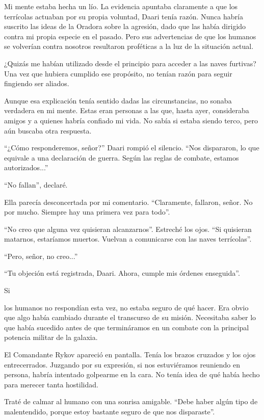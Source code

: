 Mi mente estaba hecha un lío. La evidencia apuntaba claramente a que los terrícolas actuaban por su propia voluntad, Daari tenía razón. Nunca habría suscrito las ideas de la Oradora sobre la agresión, dado que las había dirigido contra mi propia especie en el pasado. Pero sus advertencias de que los humanos se volverían contra nosotros resultaron proféticas a la luz de la situación actual.

¿Quizás me habían utilizado desde el principio para acceder a las naves furtivas? Una vez que hubiera cumplido ese propósito, no tenían razón para seguir fingiendo ser aliados.

Aunque esa explicación tenía sentido dadas las circunstancias, no sonaba verdadera en mi mente. Estas eran personas a las que, hasta ayer, consideraba amigos y a quienes habría confiado mi vida. No sabía si estaba siendo terco, pero aún buscaba otra respuesta.

``¿Cómo responderemos, señor?'' Daari rompió el silencio. ``Nos dispararon, lo que equivale a una declaración de guerra. Según las reglas de combate, estamos autorizados...''

``No fallan'', declaré.

Ella parecía desconcertada por mi comentario. ``Claramente, fallaron, señor. No por mucho. Siempre hay una primera vez para todo''.

``No creo que alguna vez quisieran alcanzarnos''. Estreché los ojos. ``Si quisieran matarnos, estaríamos muertos. Vuelvan a comunicarse con las naves terrícolas''.

``Pero, señor, no creo...''

``Tu objeción está registrada, Daari. Ahora, cumple mis órdenes enseguida''.

Si

los humanos no respondían esta vez, no estaba seguro de qué hacer. Era obvio que algo había cambiado durante el transcurso de su misión. Necesitaba saber lo que había sucedido antes de que termináramos en un combate con la principal potencia militar de la galaxia.

El Comandante Rykov apareció en pantalla. Tenía los brazos cruzados y los ojos entrecerrados. Juzgando por su expresión, si nos estuviéramos reuniendo en persona, habría intentado golpearme en la cara. No tenía idea de qué había hecho para merecer tanta hostilidad.

Traté de calmar al humano con una sonrisa amigable. ``Debe haber algún tipo de malentendido, porque estoy bastante seguro de que nos disparaste''.

